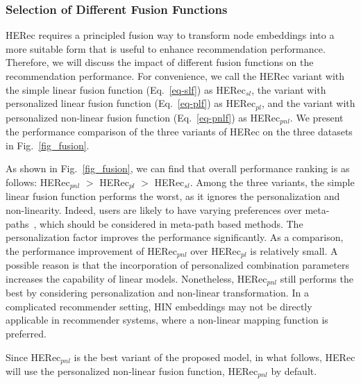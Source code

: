 \subsubsection{Selection of Different Fusion Functions}
HERec requires a principled fusion way to transform node embeddings into a more suitable form that is useful to enhance recommendation performance. Therefore, we will discuss the impact of different fusion functions on the recommendation performance.
For convenience, we call the HERec variant with the simple linear fusion function (Eq.~\ref{eq-slf}) as HERec$_{sl}$, the variant with personalized linear fusion function  (Eq.~\ref{eq-plf}) as HERec$_{pl}$,  and the variant with personalized non-linear fusion function (Eq.~\ref{eq-pnlf}) as HERec$_{pnl}$.
We present the performance comparison of the three variants of HERec on the three datasets in Fig.~\ref{fig_fusion}.

As shown in Fig.~\ref{fig_fusion}, we can find that overall performance ranking is as follows: HERec$_{pnl}$ $>$ HERec$_{pl}$ $>$ HERec$_{sl}$. Among the three variants, the simple linear fusion function performs the worst, as it ignores the personalization and non-linearity. Indeed, users are likely to have varying preferences over meta-paths~\cite{shi2015semantic}, which should be considered in meta-path based methods. The personalization factor improves the performance significantly. As a comparison, the performance improvement of
HERec$_{pnl}$ over  HERec$_{pl}$ is relatively small. A possible reason is that the incorporation of personalized combination parameters increases the capability of linear models. Nonetheless, HERec$_{pnl}$ still performs the best by considering personalization and non-linear transformation.
In a complicated recommender setting, HIN embeddings may not be directly applicable in recommender systems, where a non-linear mapping function is preferred.

Since HERec$_{pnl}$ is the best variant of the proposed model, in what follows, HERec will use the personalized non-linear fusion function, \ie HERec$_{pnl}$ by default.

